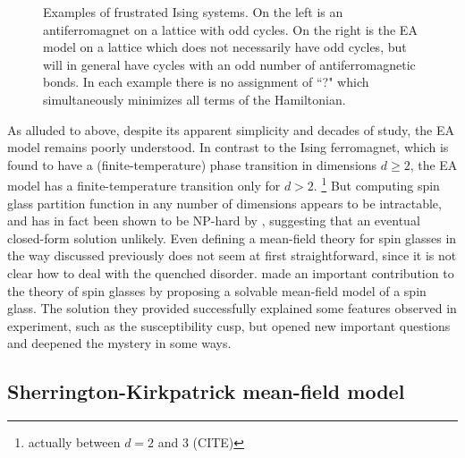 \begin{figure}
  \centering
  \begin{subfigure}{0.49\textwidth}
    \centering
    
    \label{fig:frust-afm}
  \end{subfigure}
  \begin{subfigure}{0.49\textwidth}
    \centering
    
    \label{fig:frust-disorder}
  \end{subfigure}
  \caption[Examples of frustrated Ising systems.]
  {
    Examples of frustrated Ising systems. On the left  is
    an antiferromagnet on a lattice with odd cycles. On the right
     is the EA model on a lattice which does not
    necessarily have odd cycles, but will in general have cycles with an odd
    number of antiferromagnetic bonds. In each example there is no assignment
    of ``?" which simultaneously minimizes all terms of the Hamiltonian.
  }
\end{figure}

As alluded to above, despite its apparent simplicity and decades of study, the
EA model remains poorly understood. In contrast to the Ising ferromagnet, which
is found to have a (finite-temperature) phase transition in dimensions $d \geq
2$, the EA model has a finite-temperature transition only for $d>2$.%
\footnote{%
  actually between $d=2$ and 3 (CITE)
}
But computing spin glass partition function in any number of dimensions appears
to be intractable, and has in fact been shown to be NP-hard by
\textcite{barahona1982computational}, suggesting that an eventual closed-form
solution unlikely. Even defining a mean-field theory for spin glasses in the
way discussed previously does not seem at first straightforward, since it is
not clear how to deal with the quenched disorder.
\textcite{sherrington1975solvable} made an important contribution to the theory
of spin glasses by proposing a solvable mean-field model of a spin glass. The
solution they provided successfully explained some features observed in
experiment, such as the susceptibility cusp, but opened new important questions
and deepened the mystery in some ways.


\subsection{Sherrington-Kirkpatrick mean-field model}
\label{sec:intro-sk}

